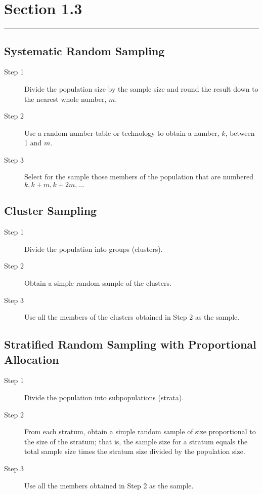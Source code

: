 \documentclass[12pt]{article}
\begin{document}
    \section*{Section 1.3}
    \noindent\rule{\textwidth}{0.4pt}
        \subsection*{Systematic Random Sampling}
            \begin{description}
                \item[Step 1] Divide the population size by the sample size and round the
                result down to the nearest whole number, $m$. 
                \item[Step 2] Use a random-number table or technology to obtain a number,
                $k$, between 1 and $m$.
                \item[Step 3] Select for the sample those members of the population that
                are numbered $k, k+m, k+2m,\dots$
            \end{description}
        \subsection*{Cluster Sampling}
            \begin{description}
                \item[Step 1] Divide the population into groups (clusters).
                \item[Step 2] Obtain a simple random sample of the clusters.
                \item[Step 3] Use all the members of the clusters obtained in Step 2 as
                the sample.   
            \end{description}
        \subsection*{Stratified Random Sampling with Proportional Allocation}
            \begin{description}
                \item[Step 1] Divide the population into subpopulations (strata).
                \item[Step 2] From each stratum, obtain a simple random sample of size
                proportional to the size of the stratum; that is, the sample size for a
                stratum equals the total sample size times the stratum size divided by the
                population size.
                \item[Step 3] Use all the members obtained in Step 2 as the sample.  
            \end{description}
\end{document}
